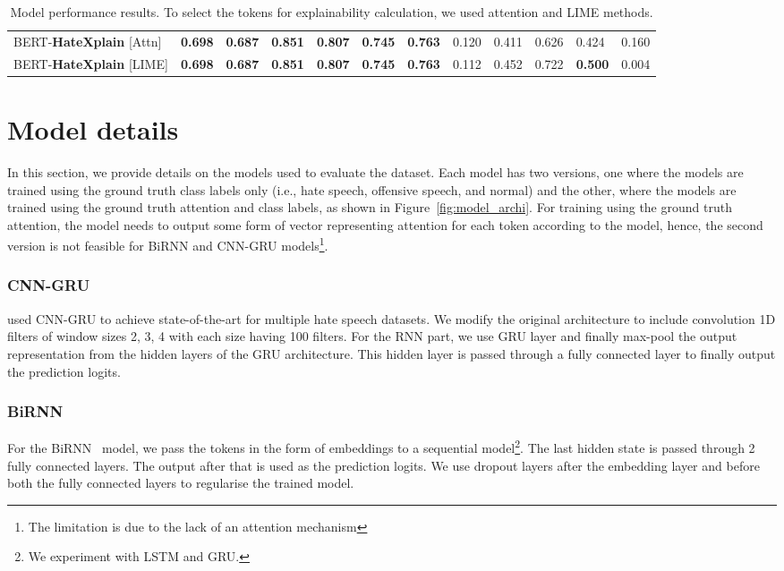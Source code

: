 \documentclass[letterpaper]{article} \usepackage{aaai21}  \usepackage{times}  \usepackage{helvet} \usepackage{courier}  \usepackage[hyphens]{url}  \usepackage{graphicx} \urlstyle{rm} \def\UrlFont{\rm}  \usepackage{natbib}  \usepackage{caption}
\begin{document}
\begin{table*}[htb!]
{\begin{tabular}{l| lll | lll | lll|ll}
BERT-{\bf{HateXplain}} [Attn]&\textbf{0.698}        &\textbf{0.687}     &\textbf{0.851}  &\textbf{0.807}     &\textbf{0.745}     &\textbf{0.763}     &0.120             &0.411              &0.626          &0.424          &0.160   \\
BERT-{\bf{HateXplain}} [LIME]&\textbf{0.698}        &\textbf{0.687}     &\textbf{0.851}  &\textbf{0.807}     &\textbf{0.745}     &\textbf{0.763}     &0.112             &0.452              &0.722          &\textbf{0.500} &0.004   \\
\hline
\end{tabular}}\caption{Model performance results. To select the tokens for explainability calculation, we used attention and LIME methods.}
\label{tab:results}
\end{table*}






\section{Model details}
\label{modeldetails}
In this section, we provide details on the models used to evaluate the dataset. Each model has two versions, one where the models are trained using the ground truth class labels only (i.e., hate speech, offensive speech, and normal) and the other, where the models are trained using the ground truth attention and class labels, as shown in Figure~\ref{fig:model_archi}. For training using the ground truth attention, the model needs to output some form of vector representing attention for each token according to the model, hence, the second version is not feasible for BiRNN and CNN-GRU models\footnote{The limitation is due to the lack of an attention mechanism}.


\subsubsection{CNN-GRU}
\citet{zhang2018detecting} used CNN-GRU to achieve state-of-the-art for multiple hate speech datasets. We modify the original architecture to include convolution 1D filters of window sizes 2, 3, 4 with each size having 100 filters. For the RNN part, we use GRU layer and finally max-pool the output representation from the hidden layers of the GRU architecture. This hidden layer is passed through a fully connected layer to finally output the prediction logits. 


\subsubsection{BiRNN} For the BiRNN~\cite{schuster1997bidirectional} model, we pass the tokens in the form of embeddings to a sequential model\footnote{We experiment with LSTM and GRU.}. The last hidden state is passed through 2 fully connected layers. The output after that is used as the prediction logits. We use  dropout layers after the embedding layer and before both the fully connected layers to regularise the trained model. 
\end{document}
